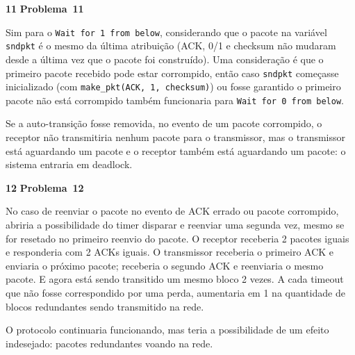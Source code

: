 \documentclass{article}
\newcounter{exe-list}
\newenvironment{exe}[2][Problema]
    {\newcommand{\opt}{(Opcional)}%
    \newcommand{\sketch}[1]{{\bfseries Rascunho:} ##1}%
    \medskip\par\noindent\ifthenelse{\equal{#1}{}}
        {\textbf{\large #2}}
        {\textbf{\large #1~#2}}%
    \medskip\par\noindent}
    {\medskip}
\begin{document}
\begin{exe}{11}
    Sim para o \texttt{Wait for 1 from below},
    considerando que o pacote na variável \texttt{sndpkt}
    é o mesmo da última atribuição
    (ACK, 0/1 e checksum não mudaram
    desde a última vez que o pacote foi construído).
    Uma consideração é que o primeiro pacote recebido
    pode estar corrompido,
    então caso \texttt{sndpkt} começasse inicializado
    (com \texttt{make\_pkt(ACK, 1, checksum)})
    ou fosse garantido o primeiro pacote não está corrompido
    também funcionaria para \texttt{Wait for 0 from below}.

    Se a auto-transição fosse removida,
    no evento de um pacote corrompido,
    o receptor não transmitiria nenhum pacote
    para o transmissor,
    mas o transmissor está aguardando um pacote
    e o receptor também está aguardando um pacote:
    o sistema entraria em deadlock.
\end{exe}

\begin{exe}{12}
    No caso de reenviar o pacote
    no evento de ACK errado ou pacote corrompido,
    abriria a possibilidade do timer disparar
    e reenviar uma segunda vez,
    mesmo se for resetado no primeiro reenvio do pacote.
    O receptor receberia 2 pacotes iguais e
    responderia com 2 ACKs iguais.
    O transmissor receberia o primeiro ACK e
    enviaria o próximo pacote;
    receberia o segundo ACK e reenviaria o mesmo pacote.
    E agora está sendo transitido um mesmo bloco 2 vezes.
    A cada timeout que não fosse correspondido por uma perda,
    aumentaria em 1 na quantidade de blocos redundantes sendo
    transmitido na rede.

    O protocolo continuaria funcionando,
    mas teria a possibilidade de um efeito indesejado:
    pacotes redundantes voando na rede.
\end{exe}
\end{document}

